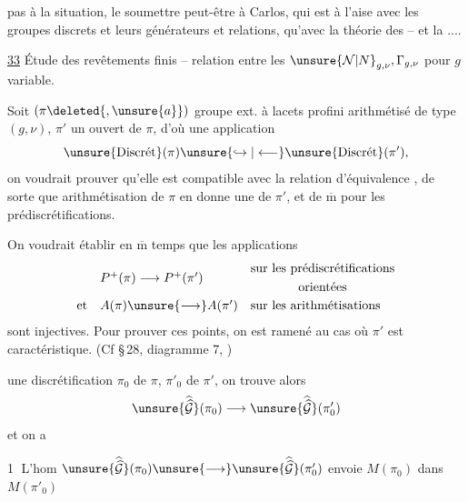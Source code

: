 
pas à la situation, le soumettre peut-être à Carlos, qui est à l'aise  avec les groupes discrets et leurs générateurs et relations, qu'avec la théorie des  -- et la  ....


\uline{33} Étude des revêtements finis -- relation entre les $\unsure{\mathcal N|N}_{g,\nu},\Gamma_{g,\nu}$ pour $g$ variable.

Soit $(\pi\deleted{,\unsure{a}})$ groupe ext. à lacets profini arithmétisé de type $(g,\nu)$, $\pi'$ un  ouvert de $\pi$, d'où une application 
\[
\unsure{\mathrm{Discr\acute{e}t}}(\pi)\unsure{\hookrightarrow|\longleftarrow}
\unsure{\mathrm{Discr\acute{e}t}}(\pi'),
\]
on voudrait prouver qu'elle est compatible avec la relation d'équivalence , de  sorte que  arithmétisation de $\pi$ en donne une de $\pi'$, et de $\overline{\mathrm m}$ pour les  prédiscrétifications.

On voudrait établir en $\overline{\mathrm m}$ temps que les applications
\[
\begin{array}{lll}
 &P^+(\pi)\longrightarrow P^+(\pi')&\begin{gathered}\text{sur les prédiscrétifications}\\\text{orientées}\end{gathered}\\[1em]
\text{et}&A(\pi)\unsure{\longrightarrow}A(\pi')&\text{sur les arithmétisations}
\end{array}
\]
sont injectives. Pour prouver ces points, on est ramené au cas où $\pi'$ est  caractéristique. (Cf \S\,28, diagramme 7, ) 


une discrétification $\pi_0$ de $\pi$,  $\pi'_0$ de $\pi'$, on trouve alors
\[
\unsure{\widehat{\widehat{\mathcal G}}}(\pi_0)\longrightarrow
\unsure{\widehat{\widehat{\mathcal G}}}(\pi'_0)
\]
et on a

\textcircled{1} L'hom $\unsure{\widehat{\widehat{\mathcal G}}}(\pi_0)\unsure{\longrightarrow}\unsure{\widehat{\widehat{\mathcal G}}}(\pi'_0)$ envoie $M(\pi_0)$ dans $M(\pi'_0)$

